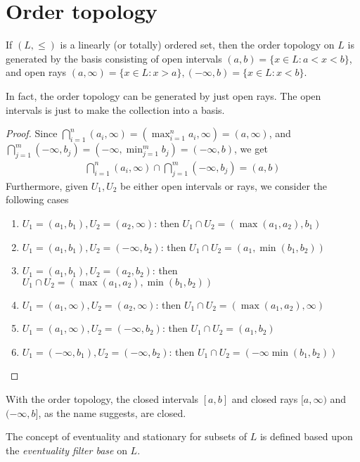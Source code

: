 \documentclass{treatise}
\begin{document}
\section{Order topology}
If $(L, \leq)$ is a linearly (or totally) ordered set, then the order topology on $L$ is generated by the basis consisting of open intervals $(a, b) = \{ x \in L : a < x < b \}$, and open rays $(a, \infty) = \{ x \in L : x > a \}, (-\infty, b) = \{ x \in L : x < b \}$.
\begin{remark}
In fact, the order topology can be generated by just open rays. The open intervals is just to make the collection into a basis.
\end{remark}
\begin{proof}
Since $\bigcap_{i = 1}^n (a_i, \infty) = (\max_{i = 1}^n a_i, \infty) = (a, \infty)$, and $\bigcap_{j = 1}^m (-\infty, b_j) = (-\infty, \min_{j = 1}^m b_j) = (-\infty, b)$, we get
\begin{align*}
    \bigcap_{i = 1}^n (a_i, \infty) \cap \bigcap_{j = 1}^m (-\infty, b_j) = (a, b)
\end{align*}
Furthermore, given $U_1, U_2$ be either open intervals or rays, we consider the following cases
\begin{enumerate}
    \item $U_1 = (a_1, b_1), U_2 = (a_2, \infty)$: then $U_1 \cap U_2 = (\max(a_1, a_2), b_1)$
    \item $U_1 = (a_1, b_1), U_2 = (-\infty, b_2)$: then $U_1 \cap U_2 = (a_1, \min(b_1, b_2))$
    \item $U_1 = (a_1, b_1), U_2 = (a_2, b_2)$: then $U_1 \cap U_2 = (\max(a_1, a_2), \min(b_1, b_2))$
    \item $U_1 = (a_1, \infty), U_2 = (a_2, \infty)$: then $U_1 \cap U_2 = (\max(a_1, a_2), \infty)$
    \item $U_1 = (a_1, \infty), U_2 = (-\infty, b_2)$: then $U_1 \cap U_2 = (a_1, b_2)$
    \item $U_1 = (-\infty, b_1), U_2 = (-\infty, b_2)$: then $U_1 \cap U_2 = (-\infty \min(b_1, b_2))$
\end{enumerate}
\end{proof}
\begin{remark}
With the order topology, the closed intervals $[a, b]$ and closed rays $[a, \infty)$ and $(-\infty, b]$, as the name suggests, are closed.
\end{remark}
\begin{remark}
The concept of eventuality and stationary for subsets of $L$ is defined based upon the \textit{eventuality filter base} on $L$.
\end{remark}
\end{document}
